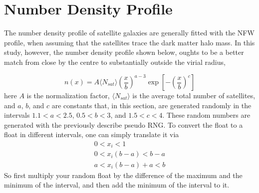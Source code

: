 \section{Number Density Profile}

The number density profile of satellite galaxies are generally fitted with the NFW profile, when assuming that the satellites trace the dark matter halo mass. %
In this study, however, the number density profile shown below, oughts to be a better match from close by the centre to substantially outside the virial radius,

\begin{equation}
n(x) = A\langle N_{sat} \rangle \left(\frac{x}{b}\right)^{a-3}\exp\left[-\left(\frac{x}{b}\right)^c\right]
\end{equation}
here $A$ is the normalization factor, $\langle N_{sat} \rangle$ is the average total number of satellites, and $a$, $b$, and $c$ are constants that, in this section, are generated randomly in the intervals $1.1 < a < 2.5$, $0.5 < b < 3$, and $1.5 < c < 4$. These random numbers are generated with the previously describe pseudo RNG. To convert the float to a float in different intervals, one can simply translate it via
\begin{gather*}
0 < x_i < 1\\
0 < x_i(b-a) < b-a\\
a < x_i(b-a) + a < b
\end{gather*}
So first multiply your random float by the difference of the maximum and the minimum of the interval, and then add the minimum of the interval to it. \\
